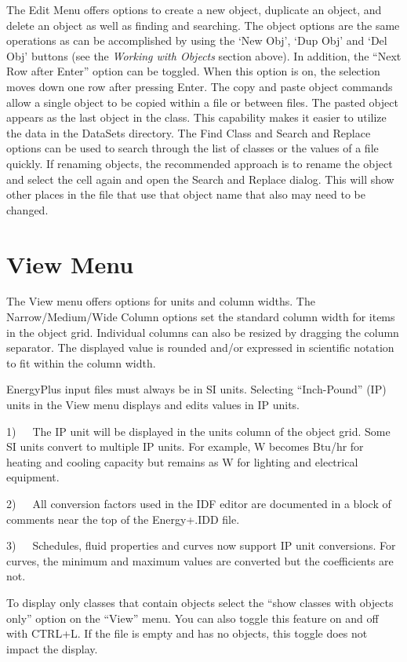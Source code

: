 The Edit Menu offers options to create a new object, duplicate an object, and delete an object as well as finding and searching. The object options are the same operations as can be accomplished by using the `New Obj', `Dup Obj' and `Del Obj' buttons (see the \emph{Working with Objects} section above). In addition, the ``Next Row after Enter'' option can be toggled. When this option is on, the selection moves down one row after pressing Enter. The copy and paste object commands allow a single object to be copied within a file or between files. The pasted object appears as the last object in the class. This capability makes it easier to utilize the data in the DataSets directory. The Find Class and Search and Replace options can be used to search through the list of classes or the values of a file quickly. If renaming objects, the recommended approach is to rename the object and select the cell again and open the Search and Replace dialog. This will show other places in the file that use that object name that also may need to be changed.

\section{View Menu}\label{view-menu-000}

The View menu offers options for units and column widths. The Narrow/Medium/Wide Column options set the standard column width for items in the object grid. Individual columns can also be resized by dragging the column separator. The displayed value is rounded and/or expressed in scientific notation to fit within the column width.

EnergyPlus input files must always be in SI units. Selecting ``Inch-Pound'' (IP) units in the View menu displays and edits values in IP units.

1)~~~The IP unit will be displayed in the units column of the object grid. Some SI units convert to multiple IP units. For example, W becomes Btu/hr for heating and cooling capacity but remains as W for lighting and electrical equipment.

2)~~~All conversion factors used in the IDF editor are documented in a block of comments near the top of the Energy+.IDD file.

3)~~~Schedules, fluid properties and curves now support IP unit conversions. For curves, the minimum and maximum values are converted but the coefficients are not.

To display only classes that contain objects select the ``show classes with objects only'' option on the ``View'' menu. You can also toggle this feature on and off with CTRL+L. If the file is empty and has no objects, this toggle does not impact the display.

